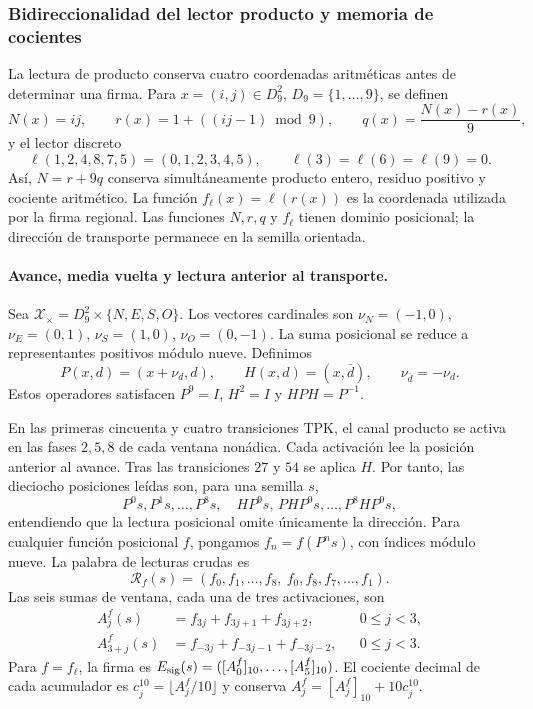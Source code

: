 \subsubsection{Bidireccionalidad del lector producto y memoria de cocientes}
\label{bim09:seccion}

La lectura de producto conserva cuatro coordenadas aritméticas antes de
determinar una firma. Para $x=(i,j)\in D_9^2$, $D_9=\{1,\ldots,9\}$,
se definen
\[
 N(x)=ij,\qquad r(x)=1+((ij-1)\bmod9),\qquad
 q(x)=\frac{N(x)-r(x)}9,
\]
y el lector discreto
\[
 \ell(1,2,4,8,7,5)=(0,1,2,3,4,5),\qquad
 \ell(3)=\ell(6)=\ell(9)=0.
\]
Así, $N=r+9q$ conserva simultáneamente producto entero, residuo positivo
y cociente aritmético. La función $f_\ell(x)=\ell(r(x))$ es la
coordenada utilizada por la firma regional. Las funciones $N,r,q$ y
$f_\ell$ tienen dominio posicional; la dirección de transporte permanece
en la semilla orientada.

\paragraph{Avance, media vuelta y lectura anterior al transporte.}

Sea $\mathscr X_\times=D_9^2\times\{N,E,S,O\}$. Los vectores cardinales
son $\nu_N=(-1,0)$, $\nu_E=(0,1)$, $\nu_S=(1,0)$,
$\nu_O=(0,-1)$. La suma posicional se reduce a representantes positivos
módulo nueve. Definimos
\[
 P(x,d)=(x+\nu_d,d),\qquad H(x,d)=(x,\bar d),
 \qquad \nu_{\bar d}=-\nu_d.
\]
Estos operadores satisfacen $P^9=I$, $H^2=I$ y $HPH=P^{-1}$.

En las primeras cincuenta y cuatro transiciones TPK, el canal producto
se activa en las fases $2,5,8$ de cada ventana nonádica. Cada activación
lee la posición anterior al avance. Tras las transiciones $27$ y $54$
se aplica $H$. Por tanto, las dieciocho posiciones leídas son, para una
semilla $s$,
\[
 P^0s,P^1s,\ldots,P^8s,\quad
 HP^9s,\,P H P^9s,\ldots,P^8H P^9s,
\]
entendiendo que la lectura posicional omite únicamente la dirección.
Para cualquier función posicional $f$, pongamos $f_n=f(P^ns)$, con
índices módulo nueve. La palabra de lecturas crudas es
\begin{equation}
 \mathcal R_f(s)=
 (f_0,f_1,\ldots,f_8,\ f_0,f_8,f_7,\ldots,f_1).
 \label{bim09:palabra}
\end{equation}
Las seis sumas de ventana, cada una de tres activaciones, son
\begin{align}
 A_j^f(s)&=f_{3j}+f_{3j+1}+f_{3j+2},&&0\leq j<3,\label{bim09:ida}\\
 A_{3+j}^f(s)&=f_{-3j}+f_{-3j-1}+f_{-3j-2},&&0\leq j<3.
 \label{bim09:vuelta}
\end{align}
Para $f=f_\ell$, la firma es
$E_{\rm sig}(s)=([A_0^f]_{10},\ldots,[A_5^f]_{10})$.
El cociente decimal de cada acumulador es
$c_j^{10}=\lfloor A_j^f/10\rfloor$ y conserva
$A_j^f=[A_j^f]_{10}+10c_j^{10}$.

